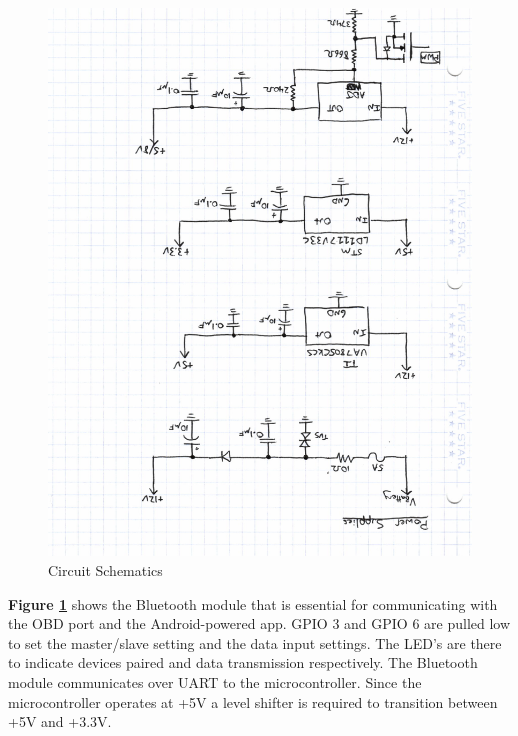 \documentclass[12pt,letterpaper]{article}
\begin{document}
\begin{figure}[H]
\centering
\includegraphics[page=2, totalheight=20cm, angle=180]{images/circuit_sch.pdf}
\caption{Circuit Schematics}
\label{fig:bt}
\end{figure}

\textbf{Figure \ref{fig:bt}} shows the Bluetooth module that is essential for communicating with the OBD port and the Android-powered app. GPIO 3 and GPIO 6 are pulled low to set the master/slave setting and the data input settings. The LED's are there to indicate devices paired and data transmission respectively. The Bluetooth module communicates over UART to the microcontroller. Since the microcontroller operates at +5V a level shifter is required to transition between +5V and +3.3V.
\end{document}
